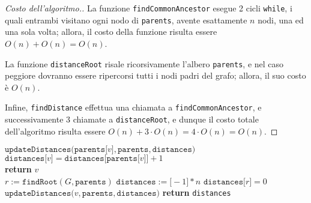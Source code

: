 \documentclass[a4paper, 12pt]{report}
\begin{document}
    \begin{proof}[Costo dell'algoritmo.]
        La funzione \texttt{findCommonAncestor} esegue 2 cicli \texttt{while}, i quali entrambi visitano ogni nodo di \texttt{parents}, avente esattamente $n$ nodi, una ed una sola volta; allora, il costo della funzione risulta essere $O(n) + O(n) = O(n)$.

        La funzione \texttt{distanceRoot} risale ricorsivamente l'albero \texttt{parents}, e nel caso peggiore dovranno essere ripercorsi tutti i nodi padri del grafo; allora, il suo costo è $O(n)$.

        Infine, \texttt{findDistance} effettua una chiamata a \texttt{findCommonAncestor}, e successivamente 3 chiamate a \texttt{distanceRoot}, e dunque il costo totale dell'algoritmo risulta essere $O(n) + 3 \cdot O(n) = 4 \cdot O(n) = O(n)$.
    \end{proof}

    \begin{algorithm}[H]
        \caption{
            Dato un grafo $G$, rappresentato attraverso liste di adiacenza, e un vettore di padri di un albero/arborescenza di visita in DFS di $G$, l'algoritmo restituisce la distanza di ogni vertice dalla radice dell'albero/arborescenza.\\
            \textbf{Input}: $G$ grafo diretto, rappresentato attraverso liste di adiacenza; \texttt{parents} un array di padri di un albero/arborescenza radicato in un certo $r \in V(G)$.\\
            \textbf{Output}: $\forall v \in V(G) \quad \mathrm{dist}(r, v)$.
        }

        \begin{algorithmic}[1]
                 
                    \State $\texttt{updateDistances(parents[}v\texttt{]}, \texttt{parents}, \texttt{distances)}$
                \EndIf
                \State $\texttt{distances[}v\texttt{]} = \texttt{distances[parents[}v\texttt{]]} + 1$
            \EndFunction
            \\
                        \State \textbf{return} $v$
                    \EndIf
                \EndFor
            \EndFunction
            \\
                \State $r := \texttt{findRoot}(G, \texttt{parents})$
                \State $\texttt{distances}:=\texttt{[}-1\texttt{]} * n$
                \State $\texttt{distances[}r\texttt{]} = 0$
                     
                        \State $\texttt{updateDistances(}v, \texttt{parents}, \texttt{distances)}$
                    \EndIf
                \EndFor
                \State \textbf{return} \texttt{distances}
            \EndFunction
        \end{algorithmic}
    \end{algorithm}
\end{document}
